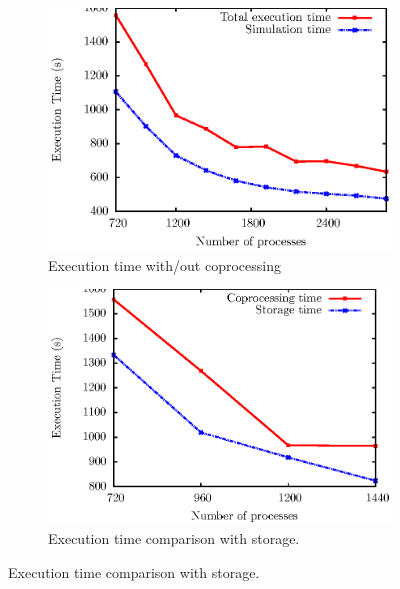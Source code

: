 \begin{figure}
        \begin{subfigure}[b]{0.40\linewidth}
          \includegraphics[scale=0.60]{pictures/test1.ps}
                \caption{Execution time with/out coprocessing}
                \label{fig:copro}
        \end{subfigure}%

        \begin{subfigure}[b]{0.40\linewidth}
                \includegraphics[scale=0.60]{pictures/test2.ps}
                \caption{Execution time comparison with storage.}
                \label{fig:ensight}
        \end{subfigure}


\end{figure}
